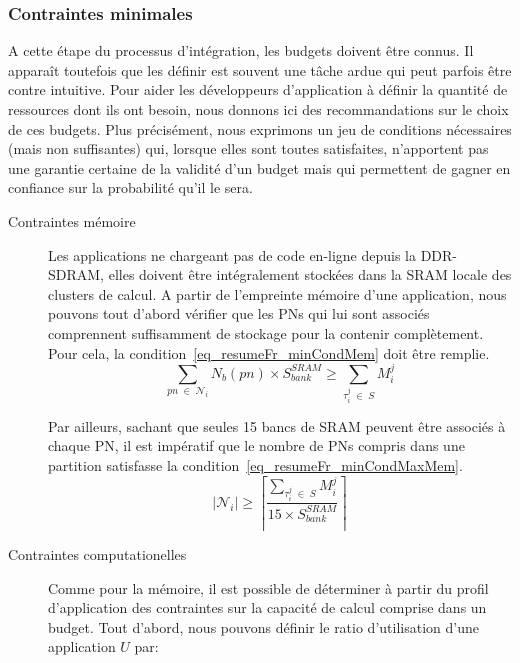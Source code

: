 \documentclass[main.tex]{subfiles}
\begin{document}
\subsubsection{Contraintes minimales}
A cette étape du processus d'intégration, les budgets doivent être connus. Il apparaît toutefois que les définir est souvent une tâche ardue qui peut parfois être contre intuitive. Pour aider les développeurs d'application à définir la quantité de ressources dont ils ont besoin, nous donnons ici des recommandations sur le choix de ces budgets. Plus précisément, nous exprimons un jeu de conditions nécessaires (mais non suffisantes) qui, lorsque elles sont toutes satisfaites, n'apportent pas une garantie certaine de la validité d'un budget mais qui permettent de gagner en confiance sur la probabilité qu'il le sera.
\begin{description}
    \item[Contraintes mémoire]
        Les applications ne chargeant pas de code en-ligne depuis la DDR-SDRAM, elles doivent être intégralement stockées dans la SRAM locale des clusters de calcul. A partir de l'empreinte mémoire d'une application, nous pouvons tout d'abord vérifier que les PNs qui lui sont associés comprennent suffisamment de stockage pour la contenir complètement. Pour cela, la condition~\ref{eq_resumeFr_minCondMem} doit être remplie.
\begin{equation}
    \underset{pn \; \in \; \mathcal{N}_i}{\sum} N_b(pn) \times S_{bank}^{SRAM} \geq
    \underset{\tau_i^j \; \in \; S}{\sum} M_i^j
    \label{eq_resumeFr_minCondMem}
\end{equation}

    Par ailleurs, sachant que seules 15 bancs de SRAM peuvent être associés à chaque PN, il est impératif que le nombre de PNs compris dans une partition satisfasse la condition~\ref{eq_resumeFr_minCondMaxMem}.
\begin{equation}
    | \mathcal{N}_i | \geq 
    \left\lceil \dfrac{  \underset{\tau_i^j \; \in \; S}{\sum} M_i^j }{15 \times  S_{bank}^{SRAM}} \right\rceil
    \label{eq_resumeFr_minCondMaxMem}
\end{equation}


    \item[Contraintes computationelles]
        Comme pour la mémoire, il est possible de déterminer à partir du profil d'application des contraintes sur la capacité de calcul comprise dans un budget. Tout d'abord, nous pouvons définir le ratio d'utilisation d'une application $U$ par:


\end{description}
\end{document}
